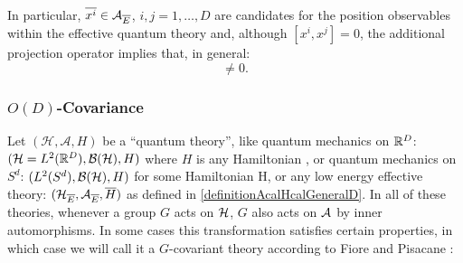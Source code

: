In particular, $\overline{x^i} \in \mathcal A_{\overline{E}}$, $i, j = 1, \dots, D$ are candidates for the position observables within the effective quantum theory and, although $[x^i, x^j] = 0$, the additional projection operator implies that, in general: 
\begin{equation}
    [\cut x^i, \cut x^j] \neq 0.
\end{equation}

\lin 

\subsubsection{$O(D)$-Covariance}

Let $(\mathcal H, \mathcal A, H)$ be a ``quantum theory'', like quantum mechanics on $\mathbb{R}^D$: $(\mathcal H = L^2(\mathbb{R}^D), \mathcal B(\mathcal H), H)$ where $H$ is any %
Hamiltonian%
, or quantum mechanics on $S^d$: $(L^2(S^d), \mathcal B(\mathcal H), H)$ for some Hamiltonian H, or any low energy effective theory: $(\mathcal H_{\overline{E}}, \mathcal A_{\overline{E}}, \overline{H})$ as defined in \ref{definitionAcalHcalGeneralD}. In all of these theories, whenever a group $G$ acts on $\mathcal H$, $G$ also acts on $\mathcal A$ by inner automorphisms. In some cases this transformation satisfies certain properties, in which case we will call it a $G$-covariant theory according to Fiore and Pisacane \cite{FioreTheCase2020}:

